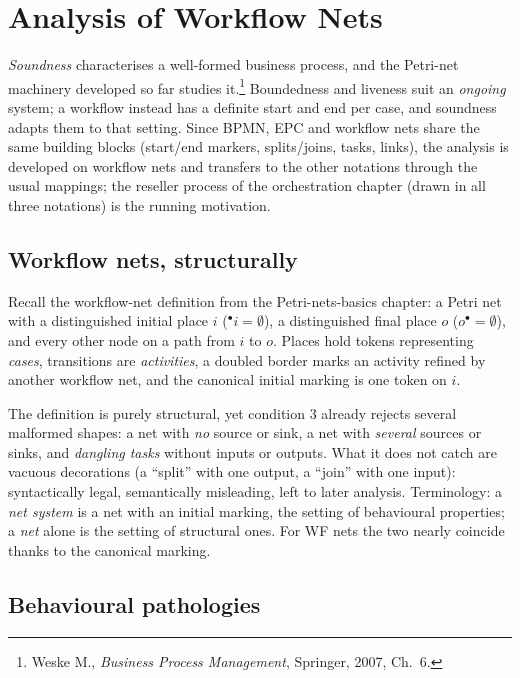 \section{Analysis of Workflow Nets}

\emph{Soundness} characterises a well-formed business process, and the Petri-net machinery developed so far studies it.\footnote{Weske M., \emph{Business Process Management}, Springer, 2007, Ch.~6.} Boundedness and liveness suit an \emph{ongoing} system; a workflow instead has a definite start and end per case, and soundness adapts them to that setting. Since BPMN, EPC and workflow nets share the same building blocks (start/end markers, splits/joins, tasks, links), the analysis is developed on workflow nets and transfers to the other notations through the usual mappings; the reseller process of the orchestration chapter (drawn in all three notations) is the running motivation.

\subsection{Workflow nets, structurally}

Recall the workflow-net definition from the Petri-nets-basics chapter: a Petri net with a distinguished initial place $i$ (${}^\bullet i = \emptyset$), a distinguished final place $o$ ($o^\bullet = \emptyset$), and every other node on a path from $i$ to $o$. Places hold tokens representing \emph{cases}, transitions are \emph{activities}, a doubled border marks an activity refined by another workflow net, and the canonical initial marking is one token on $i$.

The definition is purely structural, yet condition 3 already rejects several malformed shapes: a net with \emph{no} source or sink, a net with \emph{several} sources or sinks, and \emph{dangling tasks} without inputs or outputs. What it does not catch are vacuous decorations (a ``split'' with one output, a ``join'' with one input): syntactically legal, semantically misleading, left to later analysis. Terminology: a \emph{net system} is a net with an initial marking, the setting of behavioural properties; a \emph{net} alone is the setting of structural ones. For WF nets the two nearly coincide thanks to the canonical marking.

\subsection{Behavioural pathologies}

